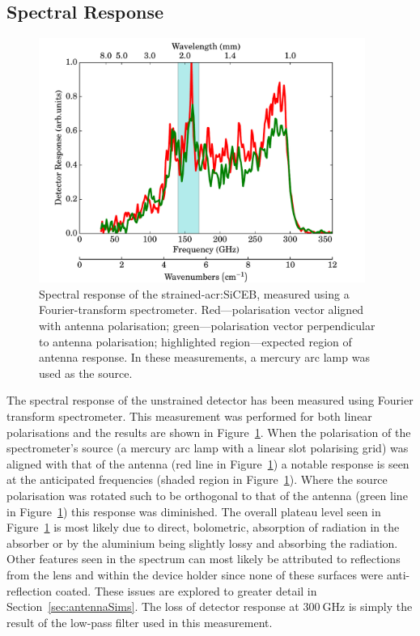 \subsection{Spectral Response}\label{ssec:opticalControlSi_spectral}
\begin{figure}[tb]
\begin{center}
\includegraphics[width = 0.95\textwidth]{figures/control_FTS}
\caption[Spectral response of the control-SiCEB]{Spectral response of the strained-\gls{acr:SiCEB}, measured using a Fourier-transform spectrometer. Red---polarisation vector aligned with antenna polarisation; green---polarisation vector perpendicular to antenna polarisation; highlighted region---expected region of antenna response. In these measurements, a mercury arc lamp was used as the source.}
\label{fig:controlSpectrum}
\end{center}
\end{figure}
The spectral response of the unstrained detector has been measured using Fourier transform spectrometer. This measurement was performed for both linear polarisations and the results are shown in Figure~\ref{fig:controlSpectrum}. When the polarisation of the spectrometer's source (a mercury arc lamp with a linear slot polarising grid) was aligned with that of the antenna (red line in Figure~\ref{fig:controlSpectrum}) a notable response is seen at the anticipated frequencies (shaded region in Figure~\ref{fig:controlSpectrum}). Where the source polarisation was rotated such to be orthogonal to that of the antenna (green line in Figure~\ref{fig:controlSpectrum}) this response was diminished. The overall plateau level seen in Figure~\ref{fig:controlSpectrum} is most likely due to direct, bolometric, absorption of radiation in the absorber or by the aluminium being slightly lossy and absorbing the radiation. Other features seen in the spectrum can most likely be attributed to reflections from the lens and within the device holder since none of these surfaces were anti-reflection coated. These issues are explored to greater detail in Section~\ref{sec:antennaSims}. The loss of detector response at $300~\mathrm{GHz}$ is simply the result of the low-pass filter used in this measurement. 
%
